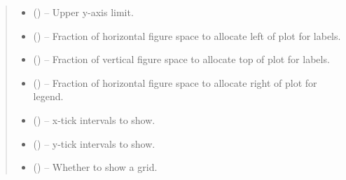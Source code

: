 \documentclass[letterpaper,10pt,english]{sphinxmanual}
\begin{document}
\begin{fulllineitems}
\begin{quote}
\begin{description}
\begin{itemize}
\item {} 
 (\sphinxstyleliteralemphasis{, }\sphinxstyleliteralemphasis{ (}\sphinxstyleliteralemphasis{)}\sphinxstyleliteralemphasis{}) -- Upper y-axis limit.

\item {} 
 (\sphinxstyleliteralemphasis{, }\sphinxstyleliteralemphasis{ (}\sphinxstyleliteralemphasis{)}\sphinxstyleliteralemphasis{}) -- Fraction of horizontal figure space to allocate left of plot for labels.

\item {} 
 (\sphinxstyleliteralemphasis{, }\sphinxstyleliteralemphasis{ (}\sphinxstyleliteralemphasis{)}\sphinxstyleliteralemphasis{}) -- Fraction of vertical figure space to allocate top of plot for labels.

\item {} 
 (\sphinxstyleliteralemphasis{, }\sphinxstyleliteralemphasis{ (}\sphinxstyleliteralemphasis{)}\sphinxstyleliteralemphasis{}) -- Fraction of horizontal figure space to allocate right of plot for
legend.

\item {} 
 (\sphinxstyleliteralemphasis{, }\sphinxstyleliteralemphasis{ (}\sphinxstyleliteralemphasis{)}\sphinxstyleliteralemphasis{}) -- x-tick intervals to show.

\item {} 
 (\sphinxstyleliteralemphasis{, }\sphinxstyleliteralemphasis{ (}\sphinxstyleliteralemphasis{)}\sphinxstyleliteralemphasis{}) -- y-tick intervals to show.

\item {} 
 (\sphinxstyleliteralemphasis{, }\sphinxstyleliteralemphasis{ (}\sphinxstyleliteralemphasis{)}\sphinxstyleliteralemphasis{}) -- Whether to show a grid.


\end{itemize}
\end{description}
\end{quote}
\end{fulllineitems}
\end{document}
